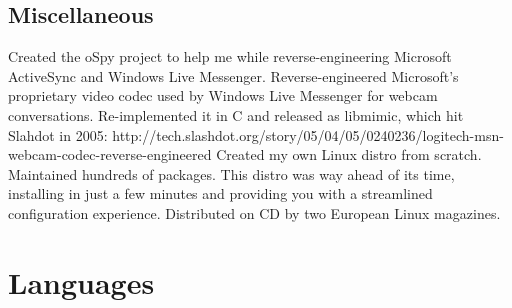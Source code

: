 \documentclass[11pt,a4paper,sans]{moderncv}
\begin{document}
\subsection{Miscellaneous}
{Created the oSpy project to help me while reverse-engineering Microsoft
ActiveSync and Windows Live Messenger.}
{Reverse-engineered Microsoft's proprietary video codec used by Windows Live Messenger
for webcam conversations. Re-implemented it in C and released as libmimic, which hit
Slahdot in 2005:\newline{}
http://tech.slashdot.org/story/05/04/05/0240236/logitech-msn-webcam-codec-reverse-engineered}
{Created my own Linux distro from scratch. Maintained hundreds of packages.
This distro was way ahead of its time, installing in just a few minutes and
providing you with a streamlined configuration experience. Distributed on CD
by two European Linux magazines.}

\section{Languages}

\nocite{*}


\end{document}

